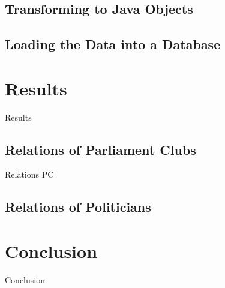 \documentclass[12pt]{report}
\begin{document}
\section{Transforming to Java Objects}

\section{Loading the Data into a Database}

\chapter{Results}
Results

\section{Relations of Parliament Clubs}
Relations PC

\section{Relations of Politicians}

\chapter{Conclusion}
Conclusion

 

\end{document}

